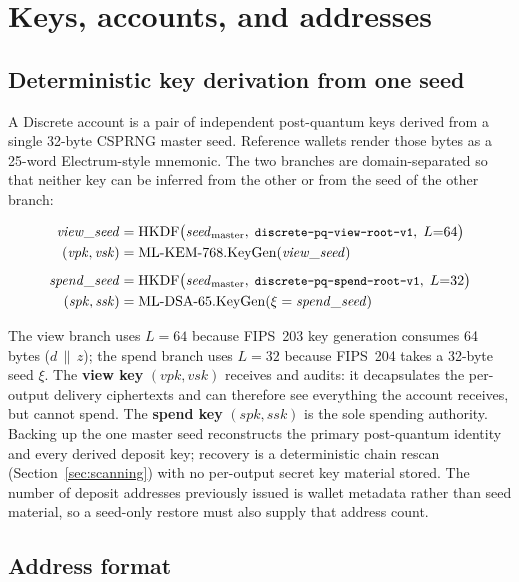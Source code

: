 \documentclass[11pt,a4paper]{article}
\newcommand{\code}[1]{\texttt{\small #1}}
\newcommand{\HKDF}{\mathrm{HKDF}}
\newcommand{\KEM}{\mathrm{ML\text{-}KEM\text{-}768}}
\newcommand{\DSA}{\mathrm{ML\text{-}DSA\text{-}65}}
\newcommand{\concat}{\,\|\,}
\begin{document}
\section{Keys, accounts, and addresses}\label{sec:keys}

\subsection{Deterministic key derivation from one seed}\label{sec:seed}

A Discrete account is a pair of independent post-quantum keys derived from a
single 32-byte CSPRNG master seed. Reference wallets render those bytes as a
25-word Electrum-style mnemonic. The two
branches are domain-separated so that neither key can be inferred from the
other or from the seed of the other branch:

\begin{align}
\mathit{view\_seed} &= \HKDF\bigl(\mathit{seed}_{\mathrm{master}},\;
    \text{\code{discrete-pq-view-root-v1}},\; L{=}64\bigr) \\
(\mathit{vpk}, \mathit{vsk}) &= \KEM.\mathrm{KeyGen}(\mathit{view\_seed}) \\[4pt]
\mathit{spend\_seed} &= \HKDF\bigl(\mathit{seed}_{\mathrm{master}},\;
    \text{\code{discrete-pq-spend-root-v1}},\; L{=}32\bigr) \\
(\mathit{spk}, \mathit{ssk}) &= \DSA.\mathrm{KeyGen}(\xi = \mathit{spend\_seed})
\end{align}

The view branch uses $L{=}64$ because FIPS~203 key generation consumes 64
bytes ($d \concat z$); the spend branch uses $L{=}32$ because FIPS~204 takes a
32-byte seed $\xi$. The \textbf{view key} $(\mathit{vpk}, \mathit{vsk})$
receives and audits: it decapsulates the per-output delivery ciphertexts and
can therefore see everything the account receives, but cannot spend. The
\textbf{spend key} $(\mathit{spk}, \mathit{ssk})$ is the sole spending
authority. Backing up the one master seed reconstructs the primary post-quantum
identity and every derived deposit key; recovery is a deterministic chain rescan
(Section~\ref{sec:scanning}) with no per-output secret key material stored.
The number of deposit addresses previously issued is wallet metadata rather than
seed material, so a seed-only restore must also supply that address count.

\subsection{Address format}
\end{document}
